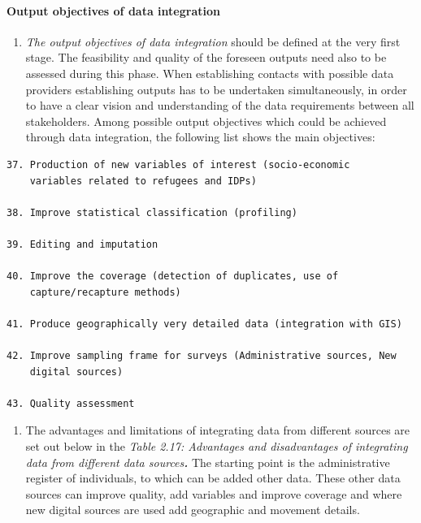 \documentclass[
]{article}
\providecommand{\tightlist}{%
  \setlength{\itemsep}{0pt}\setlength{\parskip}{0pt}}
\begin{document}
\hypertarget{d.1.-output-objectives-of-data-integration}{%
\paragraph{Output objectives of data integration}\label{d.1.-output-objectives-of-data-integration}}

\begin{enumerate}
\def\labelenumi{\arabic{enumi}.}
\setcounter{enumi}{200}
\tightlist
\item
  \emph{The output objectives of data integration} should be defined at
  the very first stage. The feasibility and quality of the foreseen
  outputs need also to be assessed during this phase. When
  establishing contacts with possible data providers establishing
  outputs has to be undertaken simultaneously, in order to have a
  clear vision and understanding of the data requirements between all
  stakeholders. Among possible output objectives which could be
  achieved through data integration, the following list shows the main
  objectives:
\end{enumerate}

\begin{verbatim}
37. Production of new variables of interest (socio-economic
    variables related to refugees and IDPs)

38. Improve statistical classification (profiling)

39. Editing and imputation

40. Improve the coverage (detection of duplicates, use of
    capture/recapture methods)

41. Produce geographically very detailed data (integration with GIS)

42. Improve sampling frame for surveys (Administrative sources, New
    digital sources)

43. Quality assessment
\end{verbatim}

\begin{enumerate}
\def\labelenumi{\arabic{enumi}.}
\setcounter{enumi}{201}
\tightlist
\item
  The advantages and limitations of integrating data from different
  sources are set out below in the \emph{Table 2.17: Advantages and
  disadvantages of integrating data from different data sources\textbf{.}}
  The starting point is the administrative register of individuals, to
  which can be added other data. These other data sources can improve
  quality, add variables and improve coverage and where new digital
  sources are used add geographic and movement details.
\end{enumerate}
\end{document}
